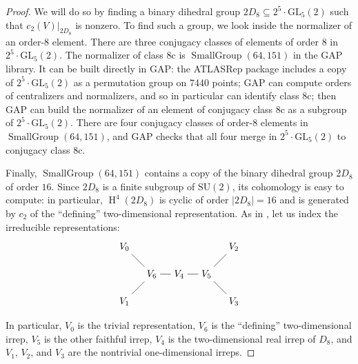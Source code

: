 \documentclass[pdftex]{sigma}
\numberwithin{equation}{section}
\newcommand\rc{\mathrm c}
\DeclareMathOperator\homology{H}
\renewcommand\H{\homology}
\newcommand\<\langle
\renewcommand\>\rangle
\newcommand\SU{\mathrm{SU}}
\newcommand{\GL}{\mathrm{GL}}
\begin{document}
\begin{proof}
We will do so by finding a binary dihedral group $2D_8 \subseteq 2^5 \cdot \GL_5(2)$ such that $c_2(V)|_{2D_8}$ is nonzero. To find such a group, we look inside the normalizer of an order-$8$ element.
There are three conjugacy classes of elements of order $8$ in $2^5\cdot \GL_5(2)$.
The normalizer of class $8\rc$ is $\operatorname{SmallGroup}(64,151)$ in the GAP library. It can be built directly in GAP: the ATLASRep package includes a copy of $2^5\cdot \GL_5(2)$ as a permutation group on 7440 points; GAP can compute orders of centralizers and normalizers, and so in particular can identify class $8\rc$; then GAP can build the normalizer of an element of conjugacy class $8\rc$ as a subgroup of $2^5\cdot \GL_5(2)$. There are four conjugacy classes of order-$8$ elements in $\operatorname{SmallGroup}(64,151)$, and GAP checks that all four merge in $2^5\cdot \GL_5(2)$ to conjugacy class $8\rc$.

Finally, $\operatorname{SmallGroup}(64,151)$ contains a copy of the binary dihedral group $2D_8$ of order $16$. Since $2D_8$ is a finite subgroup of $\SU(2)$, its cohomology is easy to compute: in particular, $\H^4(2D_8)$ is cyclic of order $|2D_8| = 16$ and is generated by $c_2$ of the ``defining'' two-dimensional representation. As in \cite[Section 6]{jft}, let us index the irreducible representations:
\begin{gather*}
\begin{tikzpicture}
 \path (0,0) node (SW) {$V_1$}
 (1,1) node (A) {$V_6$}
 (0,2) node (NW) {$V_0$}
 (2,1) node (M) {$V_4$}
 (3,1) node (B) {$V_5$}
 (4,2) node (NE) {$V_2$}
 (4,0) node (SE) {$V_3$};
 \draw (A) -- (SW); \draw (A) -- (NW); \draw (A) -- (M);
 \draw (B) -- (SE); \draw (B) -- (NE); \draw (B) -- (M);
\end{tikzpicture}
\end{gather*}
In particular, $V_0$ is the trivial representation, $V_6$ is the ``defining'' two-dimensional irrep, $V_5$ is the other faithful irrep, $V_4$ is the two-dimensional real irrep of $D_8$, and $V_1$, $V_2$, and $V_3$ are the nontrivial one-dimensional irreps.


\end{proof}
\end{document}
